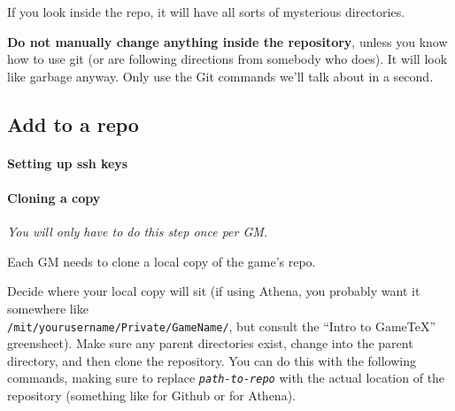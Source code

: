 \documentclass[green]{testgame}
\begin{document}

If you look inside the repo, it will have all sorts of mysterious directories.


\textbf{Do not manually change anything inside the repository}, unless you know how to use git (or are following directions from somebody who does). It will look like garbage anyway. Only use the Git commands we'll talk about in a second.

\subsection{Add \gametex{} to a repo}

\paragraph*{Setting up ssh keys}


\paragraph*{Cloning a copy}

\emph{You will only have to do this step once per GM.}

Each GM needs to clone a local copy of the game's repo.

Decide where your local copy will sit (if using Athena, you probably want it
somewhere like\\ {\tt /mit/yourusername/Private/GameName/}, but consult the
``Intro to GameTeX'' greensheet). Make sure any parent directories exist,
change into the parent directory, and then clone the repository. You can do
this with the following commands, making sure to replace
\texttt{\emph{path-to-repo}} with the actual location of the repository
(something like  for Github or
 for Athena).

\end{document}

